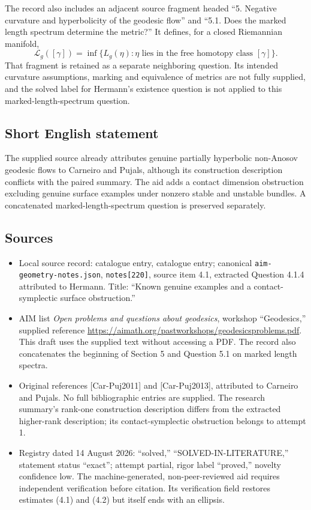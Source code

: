 \documentclass[11pt]{article}
\begin{document}
The record also includes an adjacent source fragment headed ``5. Negative curvature and hyperbolicity of the geodesic flow'' and ``5.1. Does the marked length spectrum determine the metric?'' It defines, for a closed Riemannian manifold,
\[
 \mathcal L_g([\gamma])=
 \inf\{L_g(\eta):\eta\text{ lies in the free homotopy class }[\gamma]\}.
\]
That fragment is retained as a separate neighboring question. Its intended curvature assumptions, marking and equivalence of metrics are not fully supplied, and the solved label for Hermann's existence question is not applied to this marked-length-spectrum question.
\subsection{Short English statement}
The supplied source already attributes genuine partially hyperbolic non-Anosov geodesic flows to Carneiro and Pujals, although its construction description conflicts with the paired summary. The aid adds a contact dimension obstruction excluding genuine surface examples under nonzero stable and unstable bundles. A concatenated marked-length-spectrum question is preserved separately.
\subsection{Sources}
\begin{itemize}
\item Local source record: catalogue entry, catalogue entry; canonical \texttt{aim-geometry-notes.json}, \texttt{notes[220]}, source item 4.1, extracted Question 4.1.4 attributed to Hermann. Title: ``Known genuine examples and a contact-symplectic surface obstruction.''
\item AIM list \emph{Open problems and questions about geodesics}, workshop ``Geodesics,'' supplied reference \url{https://aimath.org/pastworkshops/geodesicsproblems.pdf}. This draft uses the supplied text without accessing a PDF. The record also concatenates the beginning of Section 5 and Question 5.1 on marked length spectra.
\item Original references [Car-Puj2011] and [Car-Puj2013], attributed to Carneiro and Pujals. No full bibliographic entries are supplied. The research summary's rank-one construction description differs from the extracted higher-rank description; its contact-symplectic obstruction belongs to attempt 1.
\item Registry dated 14 August 2026: ``solved,'' ``SOLVED-IN-LITERATURE,'' statement status ``exact''; attempt partial, rigor label ``proved,'' novelty confidence low. The machine-generated, non-peer-reviewed aid requires independent verification before citation. Its verification field restores estimates (4.1) and (4.2) but itself ends with an ellipsis.
\end{itemize}
\end{document}
